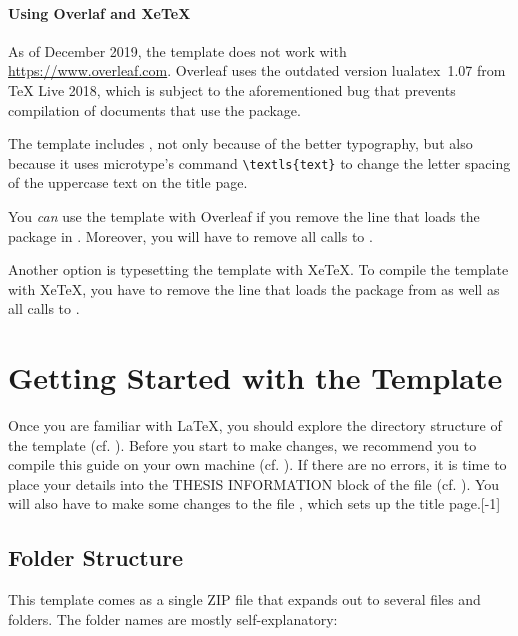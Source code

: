 \paragraph{Using Overlaf and XeTeX}

As of December 2019, the template does not work with \url{https://www.overleaf.com}. Overleaf uses the outdated version lualatex~1.07 from TeX Live 2018, which is subject to the aforementioned bug that prevents compilation of documents that use the  package.

The template includes , not only because of the better typography, but also because it uses microtype's command \verb|\textls{text}| to change the letter spacing of the uppercase text on the title page.

You \emph{can} use the template with Overleaf if you remove the line that loads the  package in . Moreover, you will have to remove all calls to .

Another option is typesetting the template with XeTeX. To compile the template with XeTeX, you have to remove the line that loads the package  from  as well as all calls to .


\section{Getting Started with the Template}

Once you are familiar with LaTeX, you should explore the directory structure of the template (cf. ). Before you start to make changes, we recommend you to compile this guide on your own machine (cf. ). If there are no errors, it is time to place your details into the THESIS INFORMATION block of the  file (cf. ). You will also have to make some changes to the file , which sets up the title page.[-1\baselineskip]


\subsection{Folder Structure}
\label{sec:folders}

This template comes as a single ZIP file that expands out to several files and folders. The folder names are mostly self-explanatory:

